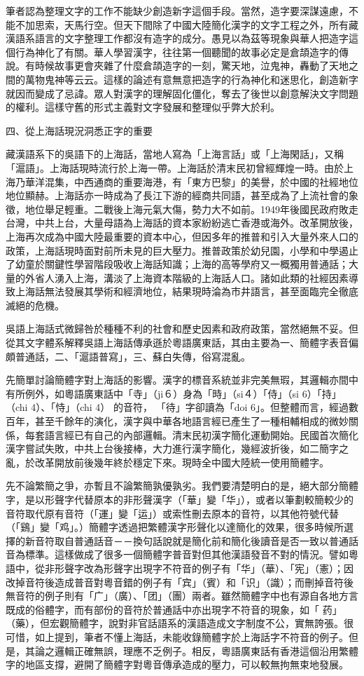 筆者認為整理文字的工作不能缺少創造新字這個手段。當然，造字要深謀遠慮，不能不加思索，天馬行空。但天下間除了中國大陸簡化漢字的文字工程之外，所有藏漢語系語言的文字整理工作都沒有造字的成分。愚見以為茲等現象與華人把造字這個行為神化了有關。華人學習漢字，往往第一個聽聞的故事必定是倉頡造字的傳說。有時候故事更會夾雜了什麼倉頡造字的一刻，驚天地，泣鬼神，轟動了天地之間的萬物鬼神等云云。這樣的論述有意無意把造字的行為神化和迷思化，創造新字就因而變成了忌諱。眾人對漢字的理解固化僵化，奪去了後世以創意解決文字問題的權利。這樣守舊的形式主義對文字發展和整理似乎弊大於利。

四、從上海話現況洞悉正字的重要

藏漢語系下的吳語下的上海話，當地人寫為「上海言話」或「上海閑話」，又稱「滬語」。上海話現時流行於上海一帶。上海話於清末民初曾經輝煌一時。由於上海乃華洋混集，中西通商的重要海港，有「東方巴黎」的美譽，於中國的社經地位地位顯赫。上海話亦一時成為了長江下游的經商共同語，甚至成為了上流社會的象徵，地位舉足輕重。二戰後上海元氣大傷，勢力大不如前。1949年後國民政府敗走台灣，中共上台，大量母語為上海話的資本家紛紛逃亡香港或海外。改革開放後，上海再次成為中國大陸最重要的資本中心，但因多年的推普和引入大量外來人口的政策，上海話現時面對前所未見的巨大壓力。推普政策於幼兒園，小學和中學遏止了幼童於關鍵性學習階段吸收上海話知識；上海的高等學府又一概獨用普通話；大量的外省人湧入上海，溝淡了上海資本階級的上海話人口。諸如此類的社經因素導致上海話無法發展其學術和經濟地位，結果現時淪為市井語言，甚至面臨完全徹底滅絕的危機。


吳語上海話式微歸咎於種種不利的社會和歷史因素和政府政策，當然絕無不妥。但從其文字體系解釋吳語上海話傳承遜於粵語廣東話，其由主要為一、簡體字表音偏頗普通話，二、「滬語普寫」，三、蘇白失傳，俗寫混亂。

先簡單討論簡體字對上海話的影響。漢字的標音系統並非完美無瑕，其邏輯亦間中有所例外，如粵語廣東話中「寺」（ji６）身為「時」（si４）「侍」（si 6）「持」（chi 4）、「恃」（chi 4） 的音符， 「待」字卻讀為「doi 6」。但整體而言，經過數百年，甚至千餘年的演化，漢字與中華各地語言經已產生了一種相輔相成的微妙關係，每套語言經已有自己的內部邏輯。清末民初漢字簡化運動開始。民國首次簡化漢字嘗試失敗，中共上台後接棒，大力進行漢字簡化，幾經波折後，如二簡字之亂，於改革開放前後幾年終於穩定下來。現時全中國大陸統一使用簡體字。

先不論繁簡之爭，亦暫且不論繁簡孰優孰劣。我們要清楚明白的是，絕大部分簡體字，是以形聲字代替原本的非形聲漢字（「華」變「华」），或者以筆劃較簡較少的音符取代原有音符（「運」變「运」）或索性刪去原本的音符，以其他符號代替（「鷄」變「鸡」。）簡體字透過把繁體漢字形聲化以達簡化的效果，很多時候所選擇的新音符取自普通話音－－換句話說就是簡化前和簡化後讀音是否一致以普通話音為標準。這樣做成了很多一個簡體字普音對但其他漢語發音不對的情況。譬如粵語中，從非形聲字改為形聲字出現字不符音的例子有「华」（華）、「宪」（憲）；因改掉音符後造成普音對粵音錯的例子有「宾」（賓）和「识」（識）；而刪掉音符後無音符的例子則有「广」（廣）、「团」（團）兩者。雖然簡體字中也有源自各地方言既成的俗體字，而有部份的音符於普通話中亦出現字不符音的現象，如「 药」（藥），但宏觀簡體字，說對非官話語系的漢語造成文字制度不公，實無誇張。很可惜，如上提到，筆者不懂上海話，未能收錄簡體字於上海話字不符音的例子。但是，其論之邏輯正確無誤，理應不乏例子。相反，粵語廣東話有香港這個沿用繁體字的地區支撐，避開了簡體字對粵音傳承造成的壓力，可以較無拘無束地發展。


